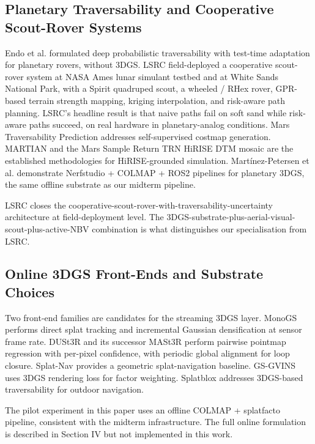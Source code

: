 \documentclass[conference]{IEEEtran}
\begin{document}
\subsection{Planetary Traversability and Cooperative Scout-Rover Systems}
Endo et al. \cite{endo} formulated deep probabilistic traversability with test-time adaptation for planetary rovers, without 3DGS. LSRC \cite{lsrc} field-deployed a cooperative scout-rover system at NASA Ames lunar simulant testbed and at White Sands National Park, with a Spirit quadruped scout, a wheeled / RHex rover, GPR-based terrain strength mapping, kriging interpolation, and risk-aware path planning. LSRC's headline result is that naive paths fail on soft sand while risk-aware paths succeed, on real hardware in planetary-analog conditions. Mars Traversability Prediction \cite{marstrav} addresses self-supervised costmap generation. MARTIAN \cite{martian} and the Mars Sample Return TRN HiRISE DTM mosaic \cite{bland} are the established methodologies for HiRISE-grounded simulation. Mart\'inez-Petersen et al. \cite{martinezpetersen} demonstrate Nerfstudio + COLMAP + ROS2 pipelines for planetary 3DGS, the same offline substrate as our midterm pipeline.

LSRC closes the cooperative-scout-rover-with-traversability-uncertainty architecture at field-deployment level. The 3DGS-substrate-plus-aerial-visual-scout-plus-active-NBV combination is what distinguishes our specialisation from LSRC.

\subsection{Online 3DGS Front-Ends and Substrate Choices}
Two front-end families are candidates for the streaming 3DGS layer. MonoGS \cite{monogs} performs direct splat tracking and incremental Gaussian densification at sensor frame rate. DUSt3R \cite{dust3r} and its successor MASt3R perform pairwise pointmap regression with per-pixel confidence, with periodic global alignment for loop closure. Splat-Nav \cite{splatnav} provides a geometric splat-navigation baseline. GS-GVINS \cite{gsgvins} uses 3DGS rendering loss for factor weighting. Splatblox \cite{splatblox} addresses 3DGS-based traversability for outdoor navigation.

The pilot experiment in this paper uses an offline COLMAP + splatfacto pipeline, consistent with the midterm infrastructure. The full online formulation is described in Section IV but not implemented in this work.
\end{document}
